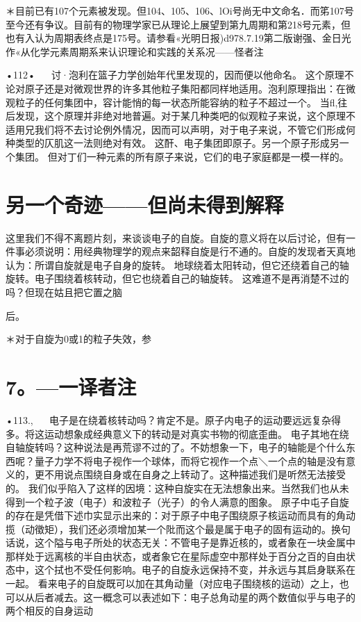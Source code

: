 ＊目前已有107个元素被发现。但104、105、106、lOi号尚无中文命名．而笫107号至今还有争议。目前有的物理学家已从理论上展望到第九周期和第218号元素，但也有入认为周期表终点是175号。请参看«光明日报)d978.7.19第二版谢强、金日光作«从化学元素周期系来认识理论和实践的关系况——怪者注

•112•
  
讨·泡利在篮子力学创始年代里发现的，因而便以他命名。
这个原理不论对原子还是对微观世界的许多其他粒子集阳都同样地适用。泡利原理指出：在微观粒子的任何集团中，容计能悄的每一状态所能容纳的粒子不超过一个。
当fl,往后发现，这个原理并非绝对地普遍。对于某几种类吧的似观粒子来说，这个原理不适用兄我们将不去讨论例外情况，因而可以声明，对于电子来说，不管它们形成何种类型的仄肌这一法则绝对有效。
这酐、电子集团即原子。另一个原子形成另一个集团。
但对丁们一种元素的所有原子来说，它们的电子家庭都是一模一样的。

\section{另一个奇迹——但尚未得到解释}

这里我们不得不离题片刻，来谈谈电子的自旋。自旋的意义将在以后讨论，但有一件事必须说明：用经典物理学的观点来韶释自旋是行不通的。自旋的发现者天真地认为：所谓自旋就是电子自身的旋转。
地球绕着太阳转动，但它还绕着自己的轴旋转。电子围绕着核转动，但它也绕着自己的轴旋转。
这难道不是再消楚不过的吗？但现在姑且把它置之脑

后。

＊对于自旋为0或1的粒子失效，参\section{7。—一译者注}

•113.,
  
电子是在绕着核转动吗？肯定不是。原子内电子的运动要远远复杂得多。将这运动想象成经典意义下的转动是对真实书物的彻底歪曲。
电子其地在绕自轴旋转吗？这种说法是再荒谬不过的了。不妨想象一下，电子的轴能是个什么东西呢？量子力学不将电子视作一个球体，而将它视作一个点＼一个点的轴是没有意义的，更不用说点围绕自身或在自身之上转动了。这种描述我们是听然无法接受的。
我们似乎陷入了这样的因境：这种自旋实在无法想象出来。当然我们也从未得到一个粒子波（电子）和波粒子（光子）的令人满意的图象。
原子中屯子自旋的存在是凭借下述巾实显示出来的：对于原子中电子围绕原子核运动而具有的角动揽（动徵矩），我们还必须增加某一个阰而这个最是属于电子的固有运动的。换句话说，这个隘与电子所处的状态无关：不管电子是靠近核的，或者象在一块金属中那样处于远离核的半自由状态，或者象它在星际虚空中那样处于百分之百的自由状态中，这个拭也不受任何影响。电子的自旋永远保持不变，并永远与其启身联系在一起。
看来电子的自旋既可以加在其角动量（对应电子围绕核的运动）之上，也可以从后者减去。这一概念可以表述如下：电子总角动星的两个数值似乎与电子的两个相反的自身运动

